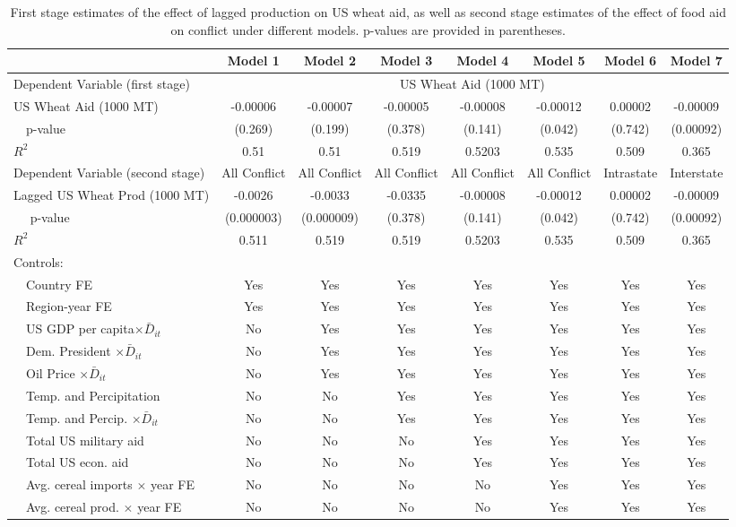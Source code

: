 \documentclass{article}
\begin{document}
\begin{table}
\centering
\scriptsize
\begin{tabular}{| l | c | c | c | c | c | c | c |}
\hline
& Model 1 & Model 2 & Model 3 & Model 4 & Model 5 & Model 6 & Model 7\\
\hline
Dependent Variable (first stage) & \multicolumn{7}{|c|}{US Wheat Aid (1000 MT)}\\
\hline 
US Wheat Aid (1000 MT) & -0.00006 & -0.00007  & -0.00005  & -0.00008  & -0.00012  & 0.00002  & -0.00009 \\
~~p-value & (0.269) & (0.199) & (0.378) & (0.141) & (0.042) & (0.742) & (0.00092)\\
$R^2$ & 0.51 & 0.51 & 0.519 & 0.5203 & 0.535 & 0.509 & 0.365  \\
\hline
Dependent Variable (second stage) & All Conflict &  All Conflict &  All Conflict &  All Conflict & All Conflict & Intrastate & Interstate \\
\hline 
Lagged US Wheat Prod (1000 MT) & -0.0026 & -0.0033  & -0.0335  & -0.00008  & -0.00012  & 0.00002  & -0.00009 \\
$ $
~~p-value & (0.000003) & (0.000009) & (0.378) & (0.141) & (0.042) & (0.742) & (0.00092)\\
$R^2$ & 0.511 & 0.519 & 0.519 & 0.5203 & 0.535 & 0.509 & 0.365  \\
\hline
Controls:\\
~~Country FE & Yes & Yes & Yes & Yes & Yes & Yes & Yes \\
~~Region-year FE & Yes & Yes & Yes & Yes & Yes & Yes & Yes \\
~~US GDP per capita$\times \bar D_{it}$  & No & Yes & Yes & Yes & Yes & Yes & Yes \\
~~Dem. President $\times \bar D_{it}$ & No & Yes & Yes & Yes & Yes & Yes & Yes \\
~~Oil Price $\times \bar D_{it}$ & No & Yes & Yes & Yes & Yes & Yes & Yes \\
~~Temp. and Percipitation & No & No & Yes & Yes & Yes & Yes & Yes \\
~~Temp. and Percip. $\times \bar D_{it}$& No & No & Yes & Yes & Yes & Yes & Yes \\
~~Total US military aid  & No & No & No & Yes & Yes & Yes & Yes \\
~~Total US econ. aid & No & No & No & Yes & Yes & Yes & Yes \\
~~Avg. cereal imports $\times$ year FE & No & No & No & No & Yes & Yes & Yes \\
~~Avg. cereal prod. $\times$ year FE & No & No & No & No & Yes & Yes & Yes \\
\hline
\end{tabular}
\label{2sls}
\normalsize
\caption{First stage estimates of the effect of lagged production on US wheat aid, as well as second stage estimates of the effect of food aid on conflict under different models. p-values are provided in parentheses.}
\end{table}
\end{document}
